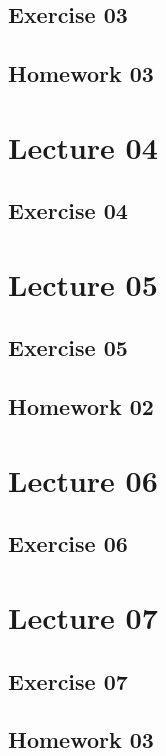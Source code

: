 \documentclass[
  digital,
  color,
  oneside,
  nosansbold,
  nocolorbold,
  lof,
  lot,
]{fithesis4}
\begin{document}
\subsection{Exercise 03}

\subsection{Homework 03}

\section{Lecture 04}

\subsection{Exercise 04}

\section{Lecture 05}

\subsection{Exercise 05}

\subsection{Homework 02}

\section{Lecture 06}

\subsection{Exercise 06}

\section{Lecture 07}

\subsection{Exercise 07}

\subsection{Homework 03}
\end{document}
